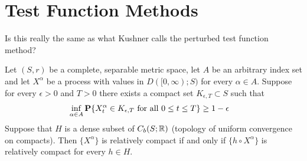 \section{Test Function Methods}
Is this really the same as what Kushner calls the perturbed test function method?

\begin{thm}\label{SkorohodInfiniteTightnessViaTestFunctions}Let $(S,r)$ be a complete, separable metric space, let $A$
  be an arbitrary index set and let $X^\alpha$ be a process with values in $D([0,\infty); S)$
for every $\alpha \in A$.  Suppose for every $\epsilon > 0$ and $T > 0$ there exists
a compact set $K_{\epsilon, T} \subset S$ such that
\begin{align*}
\inf_{\alpha \in A} \textbf{P}\{X^\alpha_t \in K_{\epsilon,T} \text{ for all } 0 \leq t \leq T\} &\geq 1 - \epsilon
\end{align*}
Suppose that $H$ is a dense subset of $C_b(S; \mathbb{R})$ (topology of uniform convergence on compacts).  Then 
$\lbrace X^\alpha \rbrace$ is relatively compact if and only if $\lbrace h \circ X^\alpha \rbrace$ is relatively compact
for every $h \in H$.  
\end{thm}
